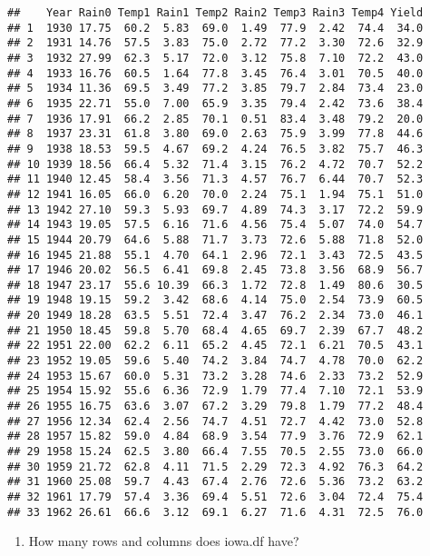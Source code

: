 \documentclass[
]{article}
\providecommand{\tightlist}{%
  \setlength{\itemsep}{0pt}\setlength{\parskip}{0pt}}
\begin{document}
\begin{verbatim}
##    Year Rain0 Temp1 Rain1 Temp2 Rain2 Temp3 Rain3 Temp4 Yield
## 1  1930 17.75  60.2  5.83  69.0  1.49  77.9  2.42  74.4  34.0
## 2  1931 14.76  57.5  3.83  75.0  2.72  77.2  3.30  72.6  32.9
## 3  1932 27.99  62.3  5.17  72.0  3.12  75.8  7.10  72.2  43.0
## 4  1933 16.76  60.5  1.64  77.8  3.45  76.4  3.01  70.5  40.0
## 5  1934 11.36  69.5  3.49  77.2  3.85  79.7  2.84  73.4  23.0
## 6  1935 22.71  55.0  7.00  65.9  3.35  79.4  2.42  73.6  38.4
## 7  1936 17.91  66.2  2.85  70.1  0.51  83.4  3.48  79.2  20.0
## 8  1937 23.31  61.8  3.80  69.0  2.63  75.9  3.99  77.8  44.6
## 9  1938 18.53  59.5  4.67  69.2  4.24  76.5  3.82  75.7  46.3
## 10 1939 18.56  66.4  5.32  71.4  3.15  76.2  4.72  70.7  52.2
## 11 1940 12.45  58.4  3.56  71.3  4.57  76.7  6.44  70.7  52.3
## 12 1941 16.05  66.0  6.20  70.0  2.24  75.1  1.94  75.1  51.0
## 13 1942 27.10  59.3  5.93  69.7  4.89  74.3  3.17  72.2  59.9
## 14 1943 19.05  57.5  6.16  71.6  4.56  75.4  5.07  74.0  54.7
## 15 1944 20.79  64.6  5.88  71.7  3.73  72.6  5.88  71.8  52.0
## 16 1945 21.88  55.1  4.70  64.1  2.96  72.1  3.43  72.5  43.5
## 17 1946 20.02  56.5  6.41  69.8  2.45  73.8  3.56  68.9  56.7
## 18 1947 23.17  55.6 10.39  66.3  1.72  72.8  1.49  80.6  30.5
## 19 1948 19.15  59.2  3.42  68.6  4.14  75.0  2.54  73.9  60.5
## 20 1949 18.28  63.5  5.51  72.4  3.47  76.2  2.34  73.0  46.1
## 21 1950 18.45  59.8  5.70  68.4  4.65  69.7  2.39  67.7  48.2
## 22 1951 22.00  62.2  6.11  65.2  4.45  72.1  6.21  70.5  43.1
## 23 1952 19.05  59.6  5.40  74.2  3.84  74.7  4.78  70.0  62.2
## 24 1953 15.67  60.0  5.31  73.2  3.28  74.6  2.33  73.2  52.9
## 25 1954 15.92  55.6  6.36  72.9  1.79  77.4  7.10  72.1  53.9
## 26 1955 16.75  63.6  3.07  67.2  3.29  79.8  1.79  77.2  48.4
## 27 1956 12.34  62.4  2.56  74.7  4.51  72.7  4.42  73.0  52.8
## 28 1957 15.82  59.0  4.84  68.9  3.54  77.9  3.76  72.9  62.1
## 29 1958 15.24  62.5  3.80  66.4  7.55  70.5  2.55  73.0  66.0
## 30 1959 21.72  62.8  4.11  71.5  2.29  72.3  4.92  76.3  64.2
## 31 1960 25.08  59.7  4.43  67.4  2.76  72.6  5.36  73.2  63.2
## 32 1961 17.79  57.4  3.36  69.4  5.51  72.6  3.04  72.4  75.4
## 33 1962 26.61  66.6  3.12  69.1  6.27  71.6  4.31  72.5  76.0
\end{verbatim}

\begin{enumerate}
\def\labelenumi{\alph{enumi}.}
\setcounter{enumi}{1}
\tightlist
\item
  How many rows and columns does iowa.df have?
\end{enumerate}
\end{document}
